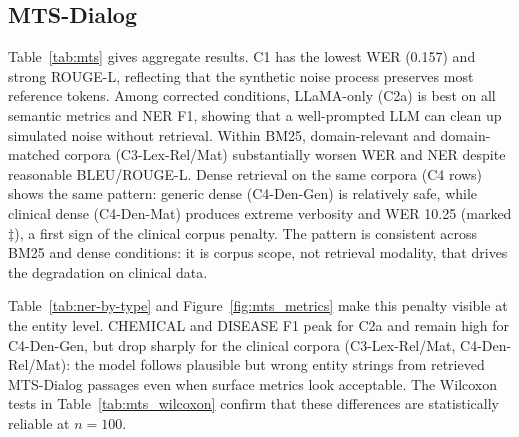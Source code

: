 \documentclass[11pt,a4paper,twocolumn]{article}
\begin{document}
\subsection{MTS-Dialog}
\label{sec:mts_results}

Table~\ref{tab:mts} gives aggregate results. C1 has the lowest WER (0.157) and
strong ROUGE-L, reflecting that the synthetic noise process preserves most
reference tokens. Among corrected conditions, LLaMA-only (C2a) is best on all
semantic metrics and NER F1, showing that a well-prompted LLM can clean up
simulated noise without retrieval. Within BM25, domain-relevant and
domain-matched corpora (C3-Lex-Rel/Mat) substantially worsen WER and NER
despite reasonable BLEU/ROUGE-L. Dense retrieval on the same corpora (C4 rows)
shows the same pattern: generic dense (C4-Den-Gen) is relatively safe, while
clinical dense (C4-Den-Mat) produces extreme verbosity and WER 10.25 (marked
$\ddagger$), a first sign of the clinical corpus penalty. The pattern is consistent across BM25 and dense conditions: it is corpus scope, not retrieval modality, that drives the degradation on clinical data.

Table~\ref{tab:ner-by-type} and Figure~\ref{fig:mts_metrics} make this penalty
visible at the entity level. CHEMICAL and DISEASE F1 peak for C2a and remain
high for C4-Den-Gen, but drop sharply for the clinical corpora (C3-Lex-Rel/Mat,
C4-Den-Rel/Mat): the model follows plausible but wrong entity strings from
retrieved MTS-Dialog passages even when surface metrics look acceptable. The
Wilcoxon tests in Table~\ref{tab:mts_wilcoxon} confirm that these differences
are statistically reliable at $n{=}100$.
\end{document}
